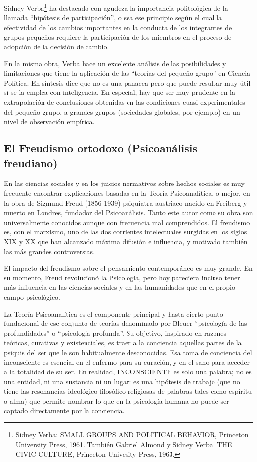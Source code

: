 \documentclass[
]{book}
\begin{document}
Sidney Verba\footnote{Sidney Verba: SMALL GROUPS AND POLITICAL BEHAVIOR, Princeton University Press, 1961. También Gabriel Almond y Sidney Verba: THE CIVIC CULTURE, Princeton Univesity Press, 1963.} ha destacado con agudeza la importancia politológica de la llamada ``hipótesis de participación'', o sea ese principio según el cual la efectividad de los cambios importantes en la conducta de los integrantes de grupos pequeños requiere la participación de los miembros en el proceso de adopción de la decisión de cambio.

En la misma obra, Verba hace un excelente análisis de las posibilidades y limitaciones que tiene la aplicación de las ``teorías del pequeño grupo'' en Ciencia Política. En síntesis dice que no es una panacea pero que puede resultar muy útil si se la emplea con inteligencia. En especial, hay que ser muy prudente en la extrapolación de conclusiones obtenidas en las condiciones cuasi-experimentales del pequeño grupo, a grandes grupos (sociedades globales, por ejemplo) en un nivel de observación empírica.

\hypertarget{el-freudismo-ortodoxo-psicoanuxe1lisis-freudiano}{%
\subsection*{El Freudismo ortodoxo (Psicoanálisis freudiano)}\label{el-freudismo-ortodoxo-psicoanuxe1lisis-freudiano}}

En las ciencias sociales y en los juicios normativos sobre hechos sociales es muy frecuente encontrar explicaciones basadas en la Teoría Psicoanalítica, o mejor, en la obra de Sigmund Freud (1856-1939) psiquíatra austríaco nacido en Freiberg y muerto en Londres, fundador del Psicoanálisis. Tanto este autor como su obra son universalmente conocidos aunque con frecuencia mal comprendidos. El freudismo es, con el marxismo, uno de las dos corrientes intelectuales surgidas en los siglos XIX y XX que han alcanzado máxima difusión e influencia, y motivado también las más grandes controversias.

El impacto del freudismo sobre el pensamiento contemporáneo es muy grande. En su momento, Freud revolucionó la Psicología, pero hoy pareciera incluso tener más influencia en las ciencias sociales y en las humanidades que en el propio campo psicológico.

La Teoría Psicoanalítica es el componente principal y hasta cierto punto fundacional de ese conjunto de teorías denominado por Bleuer ``psicología de las profundidades'' o ``psicología profunda''. Su objetivo, inspirado en razones teóricas, curativas y existenciales, es traer a la conciencia aquellas partes de la psiquis del ser que le son habitualmente desconocidas. Esa toma de conciencia del inconsciente es esencial en el enfermo para su curación, y en el sano para acceder a la totalidad de su ser. En realidad, INCONSCIENTE es sólo una palabra; no es una entidad, ni una sustancia ni un lugar: es una hipótesis de trabajo (que no tiene las resonancias ideológico-filosófico-religiosas de palabras tales como espíritu o alma) que permite nombrar lo que en la psicología humana no puede ser captado directamente por la conciencia.
\end{document}
